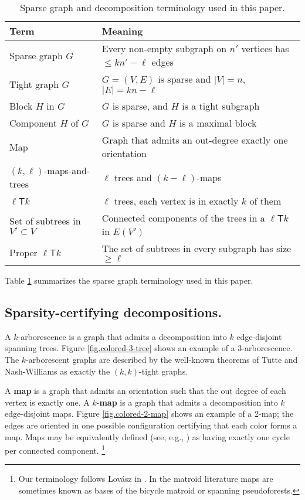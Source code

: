 \documentclass[11pt]{article}
\newcommand{\ellteekay}{\ensuremath{\ell{\mathsf T}k}\,}
\newcommand{\reffig}[1]{Figure \ref{fig.#1}}
\newcommand{\card}[1]{\ensuremath{\left\vert #1 \right\vert}}
\begin{document}
\begin{table}
		\centering 
	\begin{tabular}
		{|l|l|} \hline {\bf Term} & {\bf Meaning} \\
		\hline \hline Sparse graph $G$ & Every non-empty subgraph on $n'$ vertices has $\le kn'-\ell$ edges\\
		\hline Tight graph $G$ & $G=(V,E)$ is sparse and $\card{V}=n$, $\card{E}=kn-\ell$ \\
		\hline Block $H$ in $G$ & $G$ is sparse, and $H$ is a tight subgraph \\
		\hline Component $H$ of $G$ & $G$ is sparse and $H$ is a maximal block \\
		\hline Map & Graph that admits an out-degree exactly one orientation \\
		\hline $(k,\ell)$-maps-and-trees & $\ell$ trees and $(k-\ell)$-maps\\
		\hline \ellteekay & $\ell$ trees, each vertex is in exactly $k$ of them \\
		\hline Set of subtrees in $V'\subset V$ & Connected components of the trees in a 
		\ellteekay in $E(V')$ \\
		\hline Proper \ellteekay & The set of subtrees in every subgraph has size $\ge\ell$ \\
		\hline 
	\end{tabular}
	\caption{Sparse graph and decomposition terminology used in this paper.}	
	 \label{tab.sparse-terminology} 
\end{table}


Table \ref{tab.sparse-terminology} summarizes the sparse graph terminology used in this paper.

	
\subsection{Sparsity-certifying decompositions.}
	A $k$-arborescence is a graph that admits a decomposition into $k$ edge-disjoint spanning trees. \reffig{colored-3-tree} shows an example of a 
	$3$-arborescence.  The $k$-arborescent graphs are described by the well-known theorems of Tutte \cite{tutte61} and Nash-Williams \cite{Na61} as exactly the $(k,k)$-tight graphs. 

	A {\bf map} is a graph that admits an orientation such that the out degree of each vertex is exactly one. A $k$-{\bf map} is a graph that admits a decomposition into $k$ edge-disjoint maps.  \reffig{colored-2-map} shows an example of a 2-map; the edges
	are oriented in one possible configuration certifying that each color forms a map.
	 Maps may be equivalently defined (see, e.g., \cite{oxley:matroid}) as having exactly one cycle per connected component.  
	\footnote{Our terminology follows Lov{\'{a}}sz in \cite{lovasz:combinatorial-problems}. In the matroid literature maps are sometimes known as bases of the bicycle matroid or spanning pseudoforests.}
	
\end{document}

